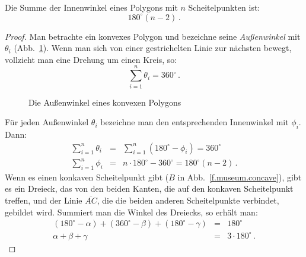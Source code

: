 \begin{theorem}\label{thm.interior-angles-of-a-polygon}
Die Summe der Innenwinkel eines Polygons mit $n$ Scheitelpunkten ist:
\[180^\circ(n-2)\,.\]
\end{theorem}
\begin{proof}
Man betrachte ein konvexes Polygon und bezeichne seine \emph{Außenwinkel} mit $\theta_i$ (Abb.~\ref{f.museum.exterior}).
Wenn man sich von einer gestrichelten Linie zur nächsten bewegt, vollzieht man eine Drehung um einen Kreis, so:
\[
\sum_{i=1}^n \theta_i = 360^\circ\,.
\]
\begin{figure}[t]
\begin{center}
\end{center}
\caption{Die Außenwinkel eines konvexen Polygons}\label{f.museum.exterior}
\end{figure}
Für jeden Außenwinkel $\theta_i$ bezeichne man den entsprechenden Innenwinkel mit $\phi_i$. Dann:
\begin{eqnarray*}
\displaystyle\sum_{i=1}^n \theta_i &=&\displaystyle\sum_{i=1}^n (180^\circ-\phi_i)= 360^\circ\\
\displaystyle\sum_{i=1}^n \phi_i &=& n\cdot 180^\circ-360^\circ =180^\circ(n-2)\,.
\end{eqnarray*}
Wenn es einen konkaven Scheitelpunkt gibt ($B$ in Abb.~\ref{f.museum.concave}), gibt es ein Dreieck, das von den beiden Kanten, die auf den konkaven Scheitelpunkt treffen, und der Linie $\overline{AC}$, die die beiden anderen Scheitelpunkte verbindet, gebildet wird. Summiert man die Winkel des Dreiecks, so erhält man:
\begin{eqnarray*}
(180^\circ - \alpha) + (360^\circ - \beta) + (180^\circ - \gamma) &=& 180^\circ\\
\alpha + \beta + \gamma &=& 3\cdot 180^\circ\,.
\end{eqnarray*}


\end{proof}
